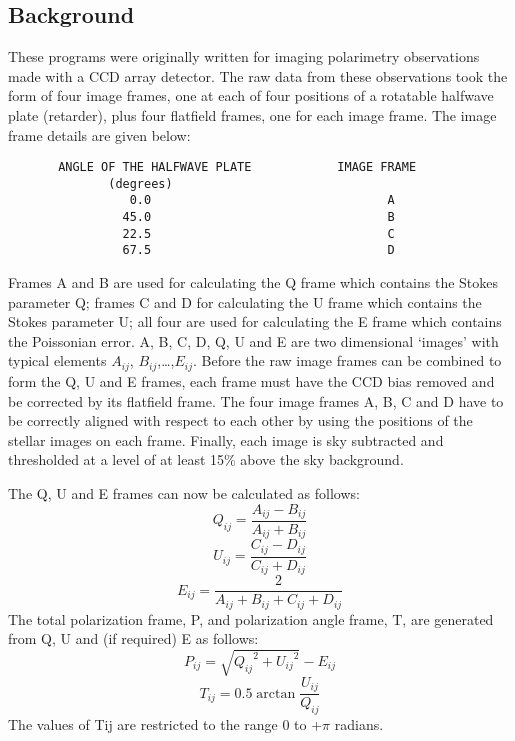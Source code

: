 \subsection {Background}
These programs were originally written for imaging polarimetry observations made
with a CCD array detector.
The raw data from these observations took the form of four image frames, one at
each of four positions of a rotatable halfwave plate (retarder), plus four
flatfield frames, one for each image frame.
The image frame details are given below:
\begin{verbatim}
       ANGLE OF THE HALFWAVE PLATE            IMAGE FRAME
              (degrees)
                 0.0                                 A
                45.0                                 B
                22.5                                 C
                67.5                                 D
\end{verbatim}
Frames A and B are used for calculating the Q frame which contains the Stokes
parameter Q; frames C and D for calculating the U frame which contains the
Stokes parameter U; all four are used for calculating the E frame which contains
the Poissonian error.
A, B, C, D, Q, U and E are two dimensional `images' with typical elements
$A_{ij}$, $B_{ij}$,\ldots,$E_{ij}$.
Before the raw image frames can be combined to form the Q, U and E frames, each
frame must have the CCD bias removed and be corrected by its flatfield frame.
The four image frames A, B, C and D have to be correctly aligned with respect to
each other by using the positions of the stellar images on each frame.
Finally, each image is sky subtracted and thresholded at a level of at least 15\%
above the sky background.

The Q, U and E frames can now be calculated as follows:
\[Q_{ij}=\frac{A_{ij}-B_{ij}}{A_{ij}+B_{ij}}\]
\[U_{ij}=\frac{C_{ij}-D_{ij}}{C_{ij}+D_{ij}}\]
\[E_{ij}=\frac{2}{A_{ij}+B_{ij}+C_{ij}+D_{ij}}\]
The total polarization frame, P, and polarization angle frame, T, are generated
from Q, U and (if required) E as follows:
\[P_{ij}=\sqrt{{Q_{ij}}^{2}+{U_{ij}}^{2}}-E_{ij}\]
\[T_{ij}=0.5\arctan \frac{U_{ij}}{Q_{ij}}\]
The values of Tij are restricted to the range 0 to +$\pi$ radians.
